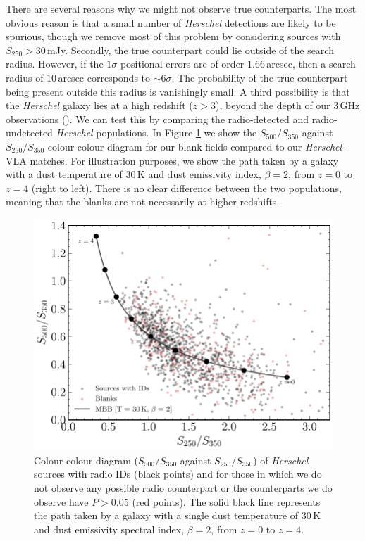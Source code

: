 There are several reasons why we might not observe true counterparts. The most obvious reason is that a small number of \textit{Herschel} detections are likely to be spurious, though we remove most of this problem by considering sources with $S_{250} > 30\,$mJy. Secondly, the true counterpart could lie outside of the search radius. However, if the $1\sigma$ positional errors are of order $1.66\,$arcsec, then a search radius of $10\,$arcsec corresponds to $\sim 6\sigma$. The probability of the true counterpart being present outside this radius is vanishingly small. A third possibility is that the \textit{Herschel} galaxy lies at a high redshift ($z > 3$), beyond the depth of our $3\,$GHz observations (\citealt{Eales_2003}). We can test this by comparing the radio-detected and radio-undetected \textit{Herschel} populations. In Figure \ref{fig:blank_fir_colours} we show the $S_{500}/S_{350}$ against $S_{250}/S_{350}$ colour-colour diagram for our blank fields compared to our \textit{Herschel}-VLA matches. For illustration purposes, we show the path taken by a galaxy with a dust temperature of $30\,$K and dust emissivity index, $\beta = 2$, from $z = 0$ to $z = 4$ (right to left). There is no clear difference between the two populations, meaning that the blanks are not necessarily at higher redshifts.

\begin{figure}
	\centering
	\includegraphics[width=0.8\columnwidth]{Figures/blank_fir_colours.pdf}
	\caption[$S_{500}/S_{350}$ against $S_{250}/S_{350}$ plot of sources with and without radio IDs]{Colour-colour diagram ($S_{500}/S_{350}$ against $S_{250}/S_{350}$) of \textit{Herschel} sources with radio IDs (black points) and for those in which we do not observe any possible radio counterpart or the counterparts we do observe have $P > 0.05$ (red points). The solid black line represents the path taken by a galaxy with a single dust temperature of $30\,$K and dust emissivity spectral index, $\beta = 2$, from $z = 0$ to $z = 4$.}
	\label{fig:blank_fir_colours}
\end{figure}

